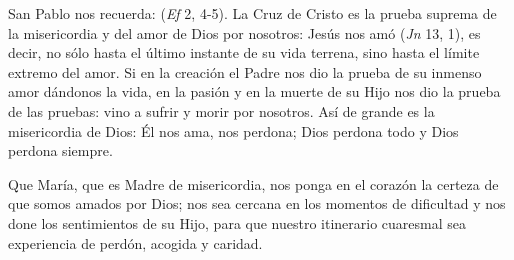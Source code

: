 \begin{body}
San Pablo nos recuerda:  (\textit{Ef} 2, 4-5). La Cruz de Cristo es la prueba suprema de la misericordia y del amor de Dios por nosotros: Jesús nos amó  (\textit{Jn} 13, 1), es decir, no sólo hasta el último instante de su vida terrena, sino hasta el límite extremo del amor. Si en la creación el Padre nos dio la prueba de su inmenso amor dándonos la vida, en la pasión y en la muerte de su Hijo nos dio la prueba de las pruebas: vino a sufrir y morir por nosotros. Así de grande es la misericordia de Dios: Él nos ama, nos perdona; Dios perdona todo y Dios perdona siempre.

Que María, que es Madre de misericordia, nos ponga en el corazón la certeza de que somos amados por Dios; nos sea cercana en los momentos de dificultad y nos done los sentimientos de su Hijo, para que nuestro itinerario cuaresmal sea experiencia de perdón, acogida y caridad.
\end{body}

\label{b2-03-04-2015A}


